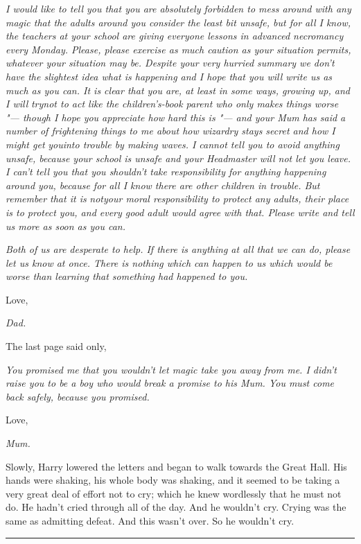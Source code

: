 \emph{I would like to tell you that you are absolutely forbidden to mess
around with any magic that the adults around you consider the least bit
unsafe, but for all I know, the teachers at your school are giving
everyone lessons in advanced necromancy every Monday. Please, please
exercise as much caution as your situation permits, whatever your
situation may be. Despite your very hurried summary we don't have the
slightest idea what is happening and I hope that you will write us as
much as you can. It is clear that you are, at least in some ways,
growing up, and I will} \emph{try}\emph{not to act like the
children's-book parent who only makes things worse "--- though I hope you
appreciate how hard this is "--- and your Mum has said a number of
frightening things to me about how wizardry stays secret and how I might
get} \emph{you}\emph{into trouble by making waves. I cannot tell you to
avoid anything unsafe, because your school is unsafe and your Headmaster
will not let you leave. I can't tell you that you shouldn't take
responsibility for anything happening around you, because for all I know
there are other children in trouble. But remember that it is}
\emph{not}\emph{your moral responsibility to protect any adults, their
place is to protect you, and every good adult would agree with that.
Please write and tell us more as soon as you can.}

\emph{Both of us are desperate to help. If there is anything at all that
we can do, please let us know at once. There is nothing which can happen
to us which would be worse than learning that something had happened to
you.}

Love,

\emph{Dad.}

The last page said only,

\emph{You promised me that you wouldn't let magic take you away from me.
I didn't raise you to be a boy who would break a promise to his Mum. You
must come back safely, because you promised.}

Love,

\emph{Mum.}

Slowly, Harry lowered the letters and began to walk towards the Great
Hall. His hands were shaking, his whole body was shaking, and it seemed
to be taking a very great deal of effort not to cry; which he knew
wordlessly that he must not do. He hadn't cried through all of the day.
And he wouldn't cry. Crying was the same as admitting defeat. And this
wasn't over. So he wouldn't cry.

\begin{center}\rule{3in}{0.4pt}\end{center}

